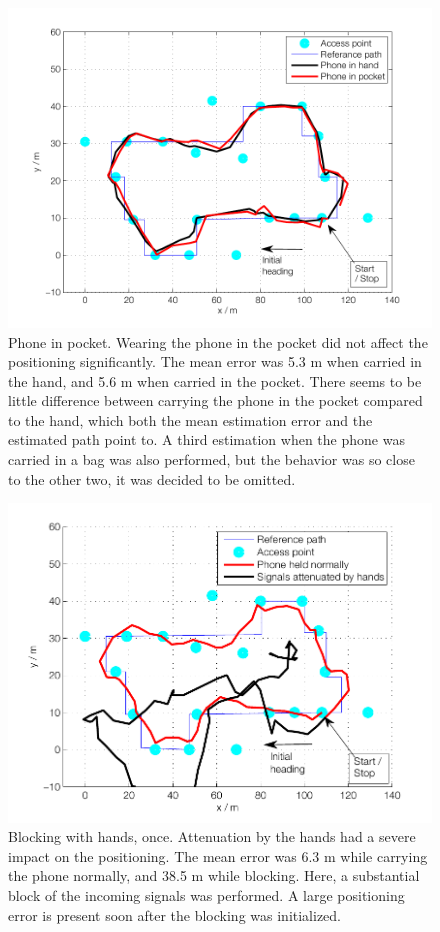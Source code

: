 \documentclass{LTHthesis}
\begin{document}
\begin{figure}

\includegraphics[width=1\textwidth ]{images/adapt_parameters/positioning_pocket}
\caption{Phone in pocket. Wearing the phone in the pocket did not affect the positioning significantly. The mean error was 5.3 m when carried in the hand, and 5.6 m when carried in the pocket. There seems to be little difference between carrying the phone in the pocket compared to the hand, which both the mean estimation error and the estimated path point to. A third estimation when the phone was carried in a bag was also performed, but the behavior was so close to the other two, it was decided to be omitted.}\label{positioning_pocket}
\end{figure}

\begin{figure}

\includegraphics[width=1\textwidth ]{images/adapt_parameters/hand_block}
\caption{Blocking with hands, once. Attenuation by the hands had a severe impact on the positioning. The mean error was 6.3 m while carrying the phone normally, and 38.5 m while blocking. Here, a substantial block of the incoming signals was performed. A large positioning error is present soon after the blocking was initialized. }\label{hand_block}
\end{figure}
\end{document}
